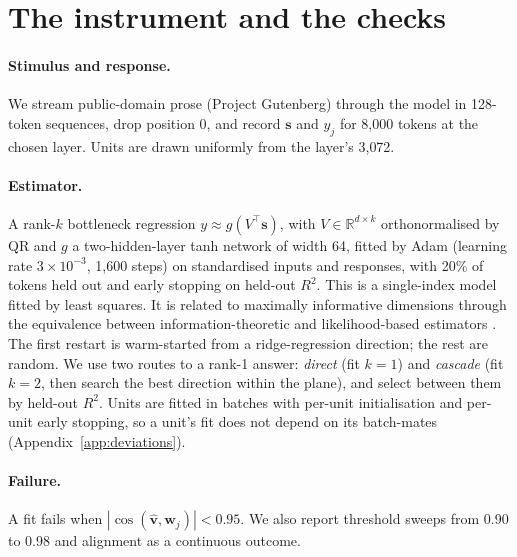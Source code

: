 \documentclass[10pt]{article}
\begin{document}
\section{The instrument and the checks}
\label{sec:method}

\paragraph{Stimulus and response.} We stream public-domain prose (Project Gutenberg) through
the model in 128-token sequences, drop position 0, and record $\mathbf{s}$ and $y_j$ for
8{,}000 tokens at the chosen layer. Units are drawn uniformly from the layer's 3{,}072.

\paragraph{Estimator.} A rank-$k$ bottleneck regression $y \approx g(V^\top \mathbf{s})$,
with $V\in\mathbb{R}^{d\times k}$ orthonormalised by QR and $g$ a two-hidden-layer tanh
network of width 64, fitted by Adam (learning rate $3\times10^{-3}$, 1{,}600 steps) on
standardised inputs and responses, with 20\% of tokens held out and early stopping on
held-out $R^2$. This is a single-index model fitted by least squares. It is related to
maximally informative dimensions \citep{sharpee2004mid} through the equivalence between
information-theoretic and likelihood-based estimators \citep{williamson2015equivalence}. The first restart is warm-started from a
ridge-regression direction; the rest are random. We use two routes to a rank-1 answer:
\emph{direct} (fit $k{=}1$) and \emph{cascade} (fit $k{=}2$, then search the best direction
within the plane), and select between them by held-out $R^2$. Units are fitted in batches
with per-unit initialisation and per-unit early stopping, so a unit's fit does not depend on
its batch-mates (Appendix~\ref{app:deviations}).

\paragraph{Failure.} A fit fails when $|\cos(\hat{\mathbf{v}},\mathbf{w}_j)| < 0.95$. We also
report threshold sweeps from 0.90 to 0.98 and alignment as a continuous outcome.
\end{document}
